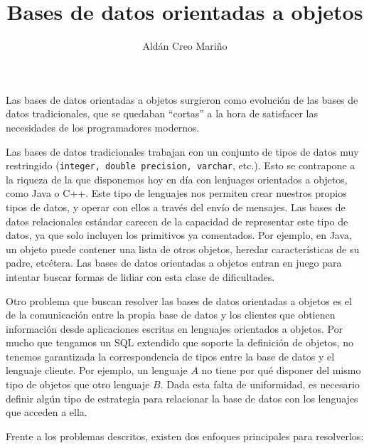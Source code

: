 \documentclass[12pt, a4paper]{article}
\title{\fontsize{15pt}{0} Bases de datos orientadas a objetos \vspace{-2ex}}
\date{\vspace{-5ex}}
\author{\fontsize{15pt}{0} \vspace{-5ex} Aldán Creo Mariño}
\begin{document}
\maketitle
\thispagestyle{empty}

\vspace{-5ex}

Las bases de datos orientadas a objetos surgieron como evolución de las bases de datos tradicionales, que se quedaban ``cortas'' a la hora de satisfacer las necesidades de los programadores modernos.

Las bases de datos tradicionales trabajan con un conjunto de tipos de datos muy restringido (\texttt{integer, double precision, varchar}, etc.). Esto se contrapone a la riqueza de la que disponemos hoy en día con lenjuages orientados a objetos, como Java o C++. Este tipo de lenguajes nos permiten crear nuestros propios tipos de datos, y operar con ellos a través del envío de mensajes. Las bases de datos relacionales estándar carecen de la capacidad de representar este tipo de datos, ya que solo incluyen los primitivos ya comentados. Por ejemplo, en Java, un objeto puede contener una lista de otros objetos, heredar características de su padre, etcétera. Las bases de datos orientadas a objetos entran en juego para intentar buscar formas de lidiar con esta clase de dificultades.

Otro problema que buscan resolver las bases de datos orientadas a objetos es el de la comunicación entre la propia base de datos y los clientes que obtienen información desde aplicaciones escritas en lenguajes orientados a objetos. Por mucho que tengamos un SQL extendido que soporte la definición de objetos, no tenemos garantizada la correspondencia de tipos entre la base de datos y el lenguaje cliente. Por ejemplo, un lenguaje $A$ no tiene por qué disponer del mismo tipo de objetos que otro lenguaje $B$. Dada esta falta de uniformidad, es necesario definir algún tipo de estrategia para relacionar la base de datos con los lenguajes que acceden a ella.

Frente a los problemas descritos, existen dos enfoques principales para resolverlos:
\end{document}
